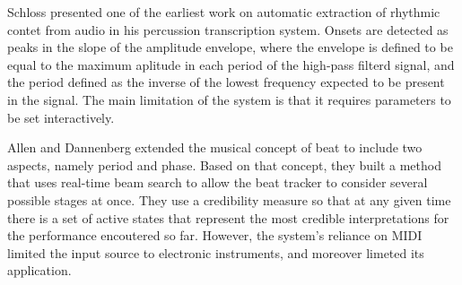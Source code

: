 \documentclass{scrartcl}
\begin{document}



Schloss \cite{Schloss1985} presented one of the earliest work on automatic extraction of rhythmic contet from audio in his percussion transcription system. Onsets are detected as peaks in the slope of the amplitude envelope, where the envelope is defined to be equal to the maximum aplitude in each period of the high-pass filterd signal, and the period defined as the inverse of the lowest frequency expected to be present in the signal. The main limitation of the system is that it requires parameters to be set interactively. 

Allen and Dannenberg \cite{Allen1990} extended the musical concept of beat to include two aspects, namely period and phase. Based on that concept, they built a method that uses real-time beam search to allow the beat tracker to consider several possible stages at once. They use a credibility measure so that at any given time there is a set of active states that represent the most credible interpretations for the performance encoutered so far. However, the system's reliance on MIDI limited the input source to electronic instruments, and moreover limeted its application.
\end{document}
